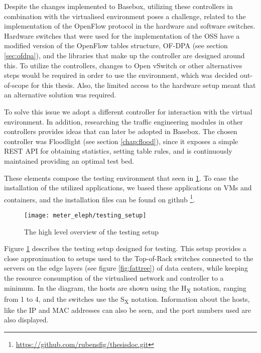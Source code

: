 \par Despite the changes implemented to Basebox, utilizing these controllers in combination with the virtualised environment poses a challenge, related 
to the implementation of the OpenFlow protocol in the hardware and software switches. Hardware switches that were used for the implementation of
the OSS have a modified version of the OpenFlow tables structure, OF-DPA (see section \ref{sec:ofdpa}), and the libraries that make up the 
controller are designed around this. To utilize the controllers, changes to Open vSwitch or other alternatives steps would be required in order to use the
environment, which was decided out-of-scope for this thesis. Also, the limited access to the hardware setup meant that an alternative solution was required.

\par To solve this issue we adopt a different controller for interaction with the virtual environment. In addition, researching the traffic engineering modules in
other controllers provides ideas that can later be adopted in Basebox. The chosen controller was Floodlight (see section \ref{chap:flood}), since it exposes a simple
REST API for obtaining statistics, setting table rules, and is continuously maintained providing an optimal test bed.

\par These elements compose the testing environment that seen in \ref{fig:test_setup}. To ease the installation of the utilized applications, 
we based these applications on VMs and containers, and the installation files can be found on github \footnote{\url{https://github.com/rubensfig/thesisdoc.git}}.

\begin{figure} [H]
    \centering
    \texttt{[image: meter\_eleph/testing\_setup]}
    \caption {The high level overview of the testing setup}
    \label{fig:test_setup}
\end{figure} 

\par Figure \ref{fig:test_setup} describes the testing setup designed for testing. This setup provides a close approximation to setups used to the Top-of-Rack
switches connected to the servers on the edge layers (see figure \ref{fig:fattree}) of data centers, while keeping the resource consumption of
the virtualised network and controller to a minimum. In the diagram, the hosts are shown using the H\textsubscript{X} notation, ranging from 1 to 4, and the switches
use the S\textsubscript{X} notation. Information about the hosts, like the IP and MAC addresses can also be seen, and the port numbers used are also displayed.

